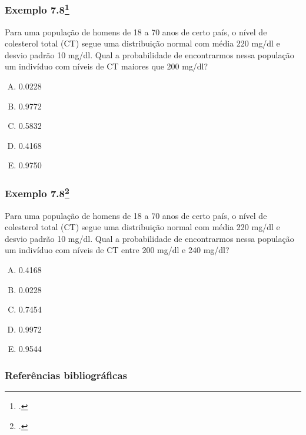 \documentclass[11pt]{beamer}
\begin{document}
\begin{frame}
\frametitle{Exemplo 7.8\footcite{martinez2015bioestatistica}}

Para uma população de homens de 18 a 70 anos de certo país, o nível de colesterol total (CT) segue uma distribuição normal com média 220 mg/dl e desvio padrão 10 mg/dl. Qual a probabilidade de encontrarmos nessa população um indivíduo com níveis de CT maiores que 200 mg/dl?

\begin{enumerate}[A)]
\item 0.0228
\item 0.9772
\item 0.5832
\item 0.4168
\item 0.9750
\end{enumerate}
\end{frame}

\begin{frame}
\frametitle{Exemplo 7.8\footcite{martinez2015bioestatistica}}

Para uma população de homens de 18 a 70 anos de certo país, o nível de colesterol total (CT) segue uma distribuição normal com média 220 mg/dl e desvio padrão 10 mg/dl. Qual a probabilidade de encontrarmos nessa população um indivíduo com níveis de CT entre 200 mg/dl e 240 mg/dl?

\begin{enumerate}[A)]
\item 0.4168
\item 0.0228
\item 0.7454
\item 0.9972
\item 0.9544
\end{enumerate}
\end{frame}

\begin{frame}
\frametitle{Referências bibliográficas}
\printbibliography
\end{frame}
\end{document}
